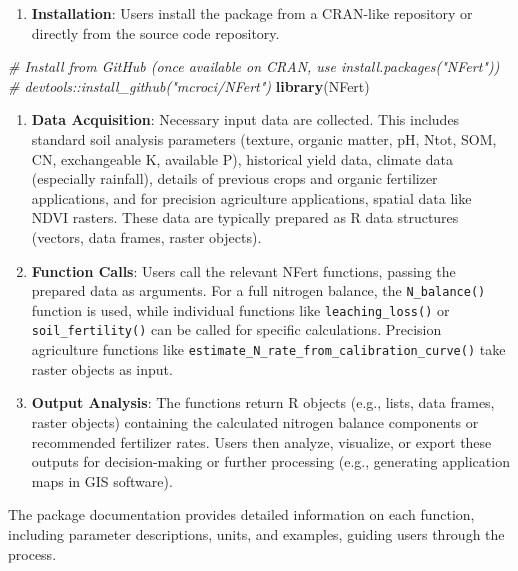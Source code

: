 \documentclass[
  11pt,
]{article}
\newenvironment{Shaded}{\begin{snugshade}}{\end{snugshade}}
\newcommand{\CommentTok}[1]{\textcolor[rgb]{0.56,0.35,0.01}{\textit{#1}}}
\newcommand{\FunctionTok}[1]{\textcolor[rgb]{0.13,0.29,0.53}{\textbf{#1}}}
\newcommand{\NormalTok}[1]{#1}
\providecommand{\tightlist}{%
  \setlength{\itemsep}{0pt}\setlength{\parskip}{0pt}}
\begin{document}
\begin{enumerate}
\def\labelenumi{\arabic{enumi}.}
\tightlist
\item
  \textbf{Installation}: Users install the package from a CRAN-like
  repository or directly from the source code repository.
\end{enumerate}

\begin{Shaded}
\begin{Highlighting}[]
\CommentTok{\# Install from GitHub (once available on CRAN, use install.packages("NFert"))}
\CommentTok{\# devtools::install\_github("mcroci/NFert")}
\FunctionTok{library}\NormalTok{(NFert)}
\end{Highlighting}
\end{Shaded}

\begin{enumerate}
\def\labelenumi{\arabic{enumi}.}
\setcounter{enumi}{1}
\item
  \textbf{Data Acquisition}: Necessary input data are collected. This
  includes standard soil analysis parameters (texture, organic matter,
  pH, Ntot, SOM, CN, exchangeable K, available P), historical yield
  data, climate data (especially rainfall), details of previous crops
  and organic fertilizer applications, and for precision agriculture
  applications, spatial data like NDVI rasters. These data are typically
  prepared as R data structures (vectors, data frames, raster objects).
\item
  \textbf{Function Calls}: Users call the relevant NFert functions,
  passing the prepared data as arguments. For a full nitrogen balance,
  the \texttt{N\_balance()} function is used, while individual functions
  like \texttt{leaching\_loss()} or \texttt{soil\_fertility()} can be
  called for specific calculations. Precision agriculture functions like
  \texttt{estimate\_N\_rate\_from\_calibration\_curve()} take raster
  objects as input.
\item
  \textbf{Output Analysis}: The functions return R objects (e.g., lists,
  data frames, raster objects) containing the calculated nitrogen
  balance components or recommended fertilizer rates. Users then
  analyze, visualize, or export these outputs for decision-making or
  further processing (e.g., generating application maps in GIS
  software).
\end{enumerate}

The package documentation provides detailed information on each
function, including parameter descriptions, units, and examples, guiding
users through the process.
\end{document}
